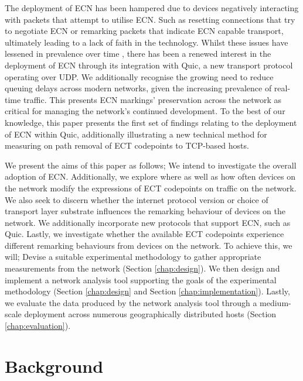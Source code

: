 \documentclass{l4proj}
\begin{document}
The deployment of ECN has been hampered due to devices negatively interacting with packets that attempt to utilise ECN. Such as resetting connections that try to negotiate ECN or remarking packets that indicate ECN capable transport\cite{floyd_inappropriate_2002}, ultimately leading to a lack of faith in the technology. Whilst these issues have lessened in prevalence over time \cite{trammell_enabling_2015}, there has been a renewed interest in the deployment of ECN through its integration with Quic, a new transport protocol operating over UDP\cite{johansson_ecn_2017}. We additionally recognise the growing need to reduce queuing delays across modern networks, given the increasing prevalence of real-time traffic. This presents ECN markings' preservation across the network as critical for managing the network's continued development. To the best of our knowledge, this paper presents the first set of findings relating to the deployment of ECN within Quic, additionally illustrating a new technical method for measuring on path removal of ECT codepoints to TCP-based hosts.

We present the aims of this paper as follows; We intend to investigate the overall adoption of ECN. Additionally, we explore where as well as how often devices on the network modify the expressions of ECT codepoints on traffic on the network. We also seek to discern whether the internet protocol version or choice of transport layer substrate influences the remarking behaviour of devices on the network. We additionally incorporate new protocols that support ECN, such as Quic. Lastly, we investigate whether the available ECT codepoints experience different remarking behaviours from devices on the network. To achieve this, we will; Devise a suitable experimental methodology to gather appropriate measurements from the network (Section \ref{chap:design}). We then design and implement a network analysis tool supporting the goals of the experimental methodology (Section \ref{chap:design} and Section \ref{chap:implementation}). Lastly, we evaluate the data produced by the network analysis tool through a medium-scale deployment across numerous geographically distributed hosts (Section \ref{chap:evaluation}).

\clearpage


\chapter{Background}
\label{chap:background}
\end{document}
